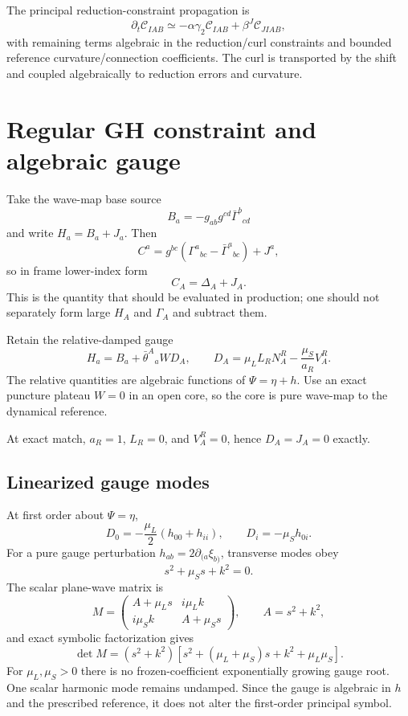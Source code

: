 \documentclass[11pt]{article}
\newcommand{\bt}{\bar\theta}
\newcommand{\cC}{\mathcal C}
\begin{document}
The principal reduction-constraint propagation is
\begin{equation}
\partial_t\cC_{IAB}\simeq-\alpha\gamma_2\cC_{IAB}+\beta^J\cC_{JIAB},
\end{equation}
with remaining terms algebraic in the reduction/curl constraints and bounded reference curvature/connection coefficients. The curl is transported by the shift and coupled algebraically to reduction errors and curvature.

\section{Regular GH constraint and algebraic gauge}
Take the wave-map base source
\[
B_a=-g_{ab}g^{cd}\bar\Gamma^b{}_{cd}
\]
and write $H_a=B_a+J_a$. Then
\[
C^a=g^{bc}(\Gamma^a{}_{bc}-\bar\Gamma^a{}_{bc})+J^a,
\]
so in frame lower-index form
\begin{equation}
\boxed{C_A=\Delta_A+J_A.}
\label{eq:regularC}
\end{equation}
This is the quantity that should be evaluated in production; one should not separately form large $H_A$ and $\Gamma_A$ and subtract them.

Retain the relative-damped gauge
\begin{equation}
\boxed{H_a=B_a+\bt^A{}_aW D_A,\qquad
D_A=\mu_L L_RN_A^R-\frac{\mu_S}{a_R}V_A^R.}
\label{eq:gauge}
\end{equation}
The relative quantities are algebraic functions of $\Psi=\eta+h$. Use an exact puncture plateau $W=0$ in an open core, so the core is pure wave-map to the dynamical reference.

At exact match, $a_R=1$, $L_R=0$, and $V_A^R=0$, hence $D_A=J_A=0$ exactly.

\subsection{Linearized gauge modes}
At first order about $\Psi=\eta$,
\begin{equation}
D_0=-\frac{\mu_L}{2}(h_{00}+h_{ii}),\qquad D_i=-\mu_Sh_{0i}.
\end{equation}
For a pure gauge perturbation $h_{ab}=2\partial_{(a}\xi_{b)}$, transverse modes obey
\[
s^2+\mu_Ss+k^2=0.
\]
The scalar plane-wave matrix is
\[
M=\begin{pmatrix}
A+\mu_Ls&i\mu_Lk\\
i\mu_Sk&A+\mu_Ss
\end{pmatrix},\qquad A=s^2+k^2,
\]
and exact symbolic factorization gives
\begin{equation}
\boxed{\det M=(s^2+k^2)\left[s^2+(\mu_L+\mu_S)s+k^2+\mu_L\mu_S\right].}
\label{eq:gaugefactor}
\end{equation}
For $\mu_L,\mu_S>0$ there is no frozen-coefficient exponentially growing gauge root. One scalar harmonic mode remains undamped. Since the gauge is algebraic in $h$ and the prescribed reference, it does not alter the first-order principal symbol.
\end{document}

